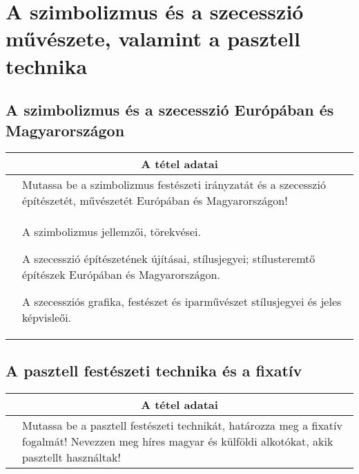 \chapter{A szimbolizmus és a szecesszió művészete, valamint a pasztell technika} %
\label{ch:15_szimbolizmus_szecesszio}

\section{A szimbolizmus és a szecesszió Európában és Magyarországon}

\begin{center}
	\begin{longtable}{ | p{} | p{} | }
		
		\hline
		\multicolumn{2}{|c|}{\textbf{A tétel adatai}}
		\\ \hline
		\hline
		
		\centering{Tétel teljes címe}
		&
		Mutassa be a szimbolizmus festészeti irányzatát és a szecesszió építészetét, művészetét Európában és Magyarországon!
		\\ \hline
		
		\centering{Jegyzetek}
		&
		\begin{compactitem}
			\item A szimbolizmus jellemzői, törekvései.
			\item A szecesszió építészetének újításai, stílusjegyei; stílusteremtő építészek Európában és Magyarországon.
			\item A szecessziós grafika, festészet és iparművészet stílusjegyei és jeles képvisleői.
		\end{compactitem}
		\\\hline
		
	\end{longtable}
\end{center}

\cleardoublepage


\section{A pasztell festészeti technika és a fixatív}

\begin{center}
	\begin{longtable}{ | p{} | p{} | }
		
		\hline
		\multicolumn{2}{|c|}{\textbf{A tétel adatai}}
		\\ \hline
		\hline
		
		\centering{Tétel teljes címe}
		&
		Mutassa be a pasztell festészeti technikát, határozza meg a fixatív fogalmát! Nevezzen meg híres magyar és külföldi alkotókat, akik pasztellt használtak!
		\\ \hline
		
	\end{longtable}
\end{center}
